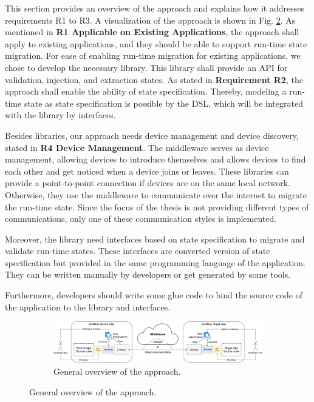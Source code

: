 This section provides an overview of the approach and explains how it addresses requirements R1 to R3.
A visualization of the approach is shown in Fig. \ref{fig:solution-overview}. As mentioned in \textbf{R1 Applicable on Existing Applications}, the approach shall apply to existing applications, and they should be able to support run-time state migration. For ease of enabling run-time migration for existing applications, we chose to develop the necessary library. This library shall provide an API for validation, injection, and extraction states. As stated in \textbf{Requirement R2}, the approach shall enable the ability of state specification. Thereby, modeling a run-time state as state specification is possible by the DSL, which will be integrated with the library by interfaces.

Besides libraries, our approach needs device management and device discovery, stated in \textbf{R4 Device Management}. The middleware serves as device management, allowing devices to introduce themselves and allows devices to find each other and get noticed when a device joins or leaves. These libraries can provide a point-to-point connection if devices are on the same local network. Otherwise, they use the middleware to communicate over the internet to migrate the run-time state. Since the focus of the thesis is not providing different types of communications, only one of these communication styles is implemented.

Moreover, the library need interfaces based on state specification to migrate and validate run-time states. These interfaces are converted version of state specification but provided in the same programming language of the application. They can be written manually by developers or get generated by some tools.

Furthermore, developers should write some glue code to bind the source code of the application to the library and interfaces.

\newpage
\FloatBarrier
\begin{figure}
\begin{figure}[H]
    \includegraphics[width=\linewidth]{../figures/solution-overview.pdf}
    \centering
    \caption{General overview of the approach.}
    \label{fig:solution-overview}
\end{figure}
\end{figure}
\FloatBarrier
